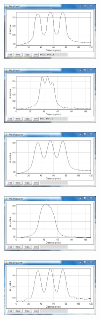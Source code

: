 \documentclass{article}
\begin{document}
\begin{figure}[h]
	\centering
	\begin{subfigure}[b]{0.5\textwidth}
		\centering
		\includegraphics[height=1.15in]{./immagini_terza_prova/ex2/25_profile_histo_raw.PNG}
		
	\end{subfigure}%
	\begin{subfigure}[b]{0.5\textwidth}
		\centering
		\includegraphics[height=1.15in]{./immagini_terza_prova/ex2/62_prof_histo_raw.PNG}
		
	\end{subfigure}%
	\bigbreak
	\begin{subfigure}[b]{0.5\textwidth}
		\centering
		\includegraphics[height=1.15in]{./immagini_terza_prova/ex2/25_prof_histo_gaussian.PNG}
		
	\end{subfigure}%
	\begin{subfigure}[b]{0.5\textwidth}
		\centering
		\includegraphics[height=1.15in]{./immagini_terza_prova/ex2/62_prof_histo_gaussian.png}
		
	\end{subfigure}%
	\bigbreak
		\begin{subfigure}[b]{0.5\textwidth}
			\centering
			\includegraphics[height=1.15in]{./immagini_terza_prova/ex2/25_prof_histo_fft.PNG}
			

\end{subfigure}
\end{figure}
\end{document}
